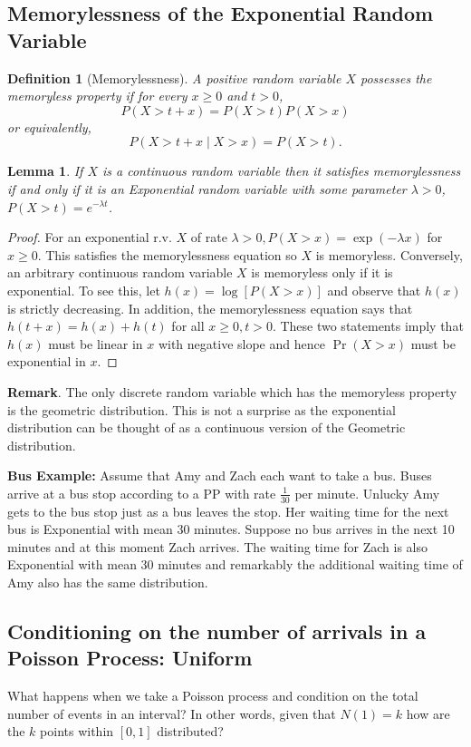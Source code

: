 \documentclass[11pt,a4paper]{article}
\newtheorem{definition}{Definition}
\newtheorem{lemma}{Lemma}
\begin{document}
\subsection{Memorylessness of the Exponential Random Variable}
\begin{definition}[Memorylessness]
    A positive random variable $X$ possesses the memoryless property if for every $x \geq 0$ and $t>0$,
    $$
    P(X>t+x)=P(X>t) P(X>x)
    $$
    or equivalently,
    $$
    P(X>t+x \mid X>x)=P(X>t) .
    $$
\end{definition}
\begin{lemma}
    If $X$ is a continuous random variable then it satisfies memorylessness if and only if it is an Exponential random variable with some parameter $\lambda>0$, $P(X>t)=e^{-\lambda t}$.
\end{lemma}
\begin{proof}
    For an exponential r.v. $X$ of rate $\lambda>0, P(X>x)=\exp (-\lambda x)$ for $x \geq 0$. This satisfies the memorylessness equation so $X$ is memoryless. Conversely, an arbitrary continuous random variable $X$ is memoryless only if it is exponential. To see this, let $h(x)=\log [P(X>x)]$ and observe that $h(x)$ is strictly decreasing. In addition, the memorylessness equation says that $h(t+x)=h(x)+h(t)$ for all $x \geq 0, t>0$. These two statements imply that $h(x)$ must be linear in $x$ with negative slope and hence $\operatorname{Pr}(X>x)$ must be exponential in $x$.
\end{proof}

\textbf{Remark}. The only discrete random variable which has the memoryless property is the geometric distribution. This is not a surprise as the exponential distribution can be thought of as a continuous version of the Geometric distribution.

\textbf{Bus Example:} Assume that Amy and Zach each want to take a bus. Buses arrive at a bus stop according to a PP with rate $\frac{1}{30}$ per minute. Unlucky Amy gets to the bus stop just as a bus leaves the stop. Her waiting time for the next bus is Exponential with mean 30 minutes. Suppose no bus arrives in the next 10 minutes and at this moment Zach arrives. The waiting time for Zach is also Exponential with mean 30 minutes and remarkably the additional waiting time of Amy also has the same distribution.

\subsection{Conditioning on the number of arrivals in a Poisson Process: Uniform}
What happens when we take a Poisson process and condition on the total number of events in an interval? In other words, given that $N(1)=k$ how are the $k$ points within $[0,1]$ distributed?
\end{document}
